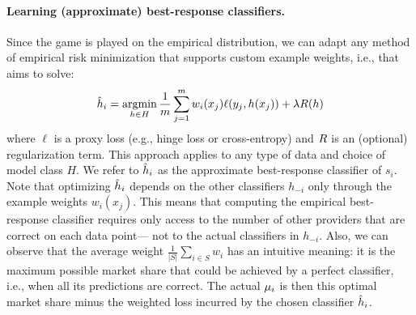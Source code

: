\paragraph{Learning (approximate) best-response classifiers.}
Since the game is played on the empirical distribution,
we can adapt any method of empirical risk minimization that supports custom example weights, i.e., that aims to solve:
\begin{equation}
\label{eq:erm}
{\hat{h}}_i = \operatorname*{argmin}_{h \in H}
\frac{1}{m} \sum_{j=1}^m  w_i(x_j) {\ell}(y_j, h(x_j))
+ \lambda R(h)
\end{equation}
where $\ell$ is a proxy loss (e.g., hinge loss or cross-entropy)
and ${R}$ is an (optional) regularization term.
This approach applies to any type of data and choice of model class $H$.
We refer to ${\hat{h}}_i$ as the approximate best-response classifier of $s_i$.
Note that optimizing ${\hat{h}}_i$ %
depends on the other classifiers $h_{-i}$ only through the example weights $w_i(x_j)$.
This means that computing the empirical best-response classifier requires
only access to the number of other providers that are correct on each data point---%
not to the actual classifiers in $h_{-i}$.
Also, we can observe that the average weight $\frac{1}{|S|}\sum_{i \in S} w_i$ has an intuitive meaning: it is the maximum possible market share that could be achieved by a perfect classifier, i.e., when all its predictions are correct.
The actual $\mu_i$ is then this optimal market share minus the weighted
loss incurred by the chosen classifier ${\hat{h}}_i$.
